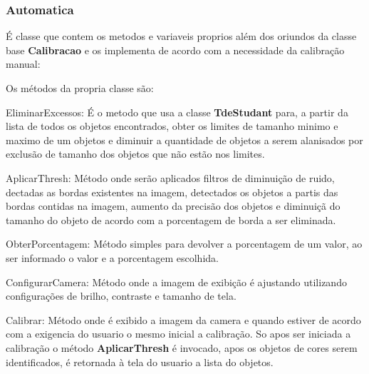 %		
%		
%		
% 
%		     
%	        
%	
%	
%	
%			
%	
%	
%
\subsubsection{Automatica}
 É classe que contem os metodos e variaveis proprios além dos oriundos da classe base \textbf{Calibracao} e os implementa de acordo com a necessidade da calibração manual:
 
Os métodos da propria classe são:
	\begin{description}
	\item EliminarExcessos: É o metodo que usa a classe \textbf{TdeStudant} para, a partir da lista de todos os objetos encontrados, obter os limites de tamanho minimo e maximo de um objetos e diminuir a quantidade de objetos a serem alanisados por exclusão de tamanho dos objetos que não estão nos limites.
	\item AplicarThresh: Método onde serão aplicados filtros de diminuição de ruido, dectadas as bordas existentes na imagem, detectados os objetos a partis das bordas contidas na imagem, aumento da precisão dos objetos e diminuiçã do tamanho do objeto de acordo com a porcentagem de borda a ser eliminada. 
	\item ObterPorcentagem: Método simples para devolver a porcentagem de um valor, ao ser informado o valor  e a porcentagem escolhida.
	\item ConfigurarCamera: Método onde a imagem de exibição é ajustando utilizando configurações de brilho, contraste e tamanho de tela. 
	\item Calibrar: Método onde é exibido a imagem da camera e quando estiver de acordo com a exigencia do usuario o mesmo inicial a calibração. So apos ser iniciada a calibração o método \textbf{AplicarThresh} é invocado, apos os objetos de cores serem identificados, é retornada à tela do usuario a lista do objetos.
	\end{description}



